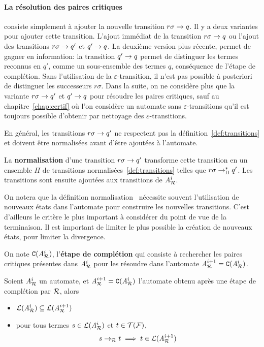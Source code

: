 \paragraph{La résolution des paires critiques} consiste simplement à ajouter la nouvelle transition $r\sigma \rightarrow q$.
Il y a deux variantes pour ajouter cette transition. L'ajout immédiat de la transition $r\sigma \rightarrow q$
ou l'ajout des transitions $r\sigma \rightarrow q'$ et $q' \rightarrow q$. La deuxième version plus récente, permet de 
gagner en information: la transition $q' \rightarrow q$ permet de distinguer les termes reconnus en $q'$, comme 
un sous-ensemble des termes $q$, conséquence de l'étape de complétion. Sans l'utilisation de la $\varepsilon$-transition,
il n'est pas possible à posteriori de distinguer les successeurs $r\sigma$. 
Dans la suite, on ne considère plus que la variante $r\sigma \rightarrow q'$ et $q' \rightarrow q$ pour résoudre les paires critiques,
sauf au chapitre~\ref{chap:certif} où l'on considère un automate  sans $\varepsilon$-transitions
qu'il est toujours possible d'obtenir par nettoyage des $\varepsilon$-transitions.

En général, les transitions $r\sigma \rightarrow q'$ ne respectent pas la définition~\ref{def:transitions}
et doivent être normalisées avant d'être ajoutées à l'automate.


\begin{definition}
  La \textbf{normalisation} d'une transition $r\sigma \rightarrow q'$ transforme cette
  transition en un ensemble $\Pi$ de transitions normalisées~\ref{def:transitions}
  telles que $r\sigma \rightarrow_\Pi^* q'$. Les transitions sont ensuite ajoutées aux transitions de ${\mathit A}_{\mathcal R}^i$.
\end{definition}
On notera que la définition normalisation~\cite{Genet-RTA98} nécessite 
souvent l'utilisation de nouveaux états dans l'automate pour construire 
les nouvelles transitions. C'est d'ailleurs le critère le plus important
à considérer du point de vue de la terminaison. Il est important de limiter le
plus possible la création de nouveaux états, pour limiter la divergence.

\begin{definition}
  On note $\mathtt{C}({\mathit A}_{\mathcal R}^i)$, l'\textbf{étape de complétion} qui consiste à rechercher les paires critiques présentes
  dans ${\mathit A}_{\mathcal R}^i$ pour les résoudre dans l'automate ${\mathit A}_{\mathcal R}^{i+1} = \mathtt{C}({\mathit A}_{\mathcal R}^i)$.
\end{definition}

\begin{property}
  Soient ${\mathit A}_{\mathcal R}^i$ un automate, et ${\mathit A}_{\mathcal R}^{i+1} = \mathtt{C}({\mathit A}_{\mathcal R}^i)$ l'automate obtenu après une
  étape de complétion par $\mathcal R$, alors
  \begin{itemize}
  \item $\mathcal{L}({\mathit A}_{\mathcal R}^i) \subseteq \mathcal{L}({\mathit A}_{\mathcal R}^{i+1})$

  \item  pour tous termes $s \in \mathcal{L}({\mathit A}_{\mathcal R}^i)$ et $t \in \mathcal{T(F)}$,
    \[s \rightarrow_\mathcal R t \; \Longrightarrow \; t\in \mathcal{L}({\mathit A}_{\mathcal R}^{i+1})\]
  \end{itemize}
\end{property}


